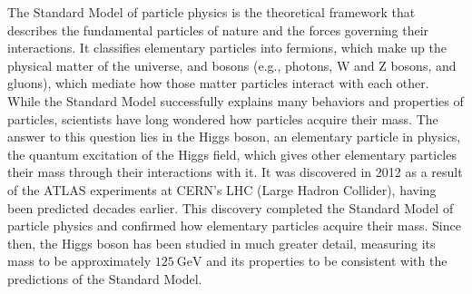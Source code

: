 \documentclass[conference]{IEEEtran}
\begin{document}
The Standard Model of particle physics is the theoretical framework that describes the fundamental particles of nature and the forces governing their interactions. It classifies elementary particles into fermions, which make up the physical matter of the universe, and bosons (e.g., photons, W and Z bosons, and gluons), which mediate how those matter particles interact with each other. While the Standard Model successfully explains many behaviors and properties of particles, scientists have long wondered how particles acquire their mass. The answer to this question lies in the Higgs boson, an elementary particle in physics, the quantum excitation of the Higgs field, which gives other elementary particles their mass through their interactions with it. It was discovered in 2012 as a result of the ATLAS experiments at CERN's LHC (Large Hadron Collider), having been predicted decades earlier. This discovery completed the Standard Model of particle physics and confirmed how elementary particles acquire their mass. Since then, the Higgs boson has been studied in much greater detail, measuring its mass to be approximately $125~\mathrm{GeV}$ and its properties to be consistent with the predictions of the Standard Model.
\end{document}
